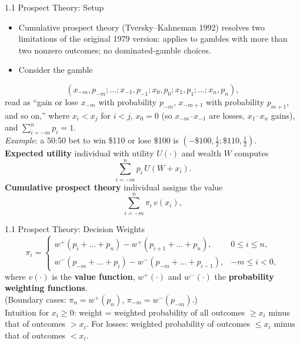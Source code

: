\documentclass[aspectratio=169, 11pt]{beamer}
\begin{document}
\begin{frame}[shrink=8]{1.1 Prospect Theory: Setup}
\begin{itemize}
  \item Cumulative prospect theory (Tversky--Kahneman 1992) resolves two limitations of the original 1979 version: applies to gambles with more than two nonzero outcomes; no dominated-gamble choices.
  \item Consider the gamble
\end{itemize}
\begin{equation}
(x_{-m},p_{-m};\ldots;x_{-1},p_{-1};x_{0},p_{0};x_{1},p_{1};\ldots;x_{n},p_{n}),
\tag{1}
\end{equation}
read as ``gain or lose $x_{-m}$ with probability $p_{-m}$, $x_{-m+1}$ with probability $p_{m+1}$, and so on,'' where $x_i<x_j$ for $i<j$, $x_0=0$ (so $x_{-m}$--$x_{-1}$ are losses, $x_1$--$x_n$ gains), and $\sum_{i=-m}^{n}p_i=1$.\\[0.5em]
\emph{Example}: a 50:50 bet to win \$110 or lose \$100 is $(-\$100,\tfrac12;\$110,\tfrac12)$.\\[0.7em]
\textbf{Expected utility} individual with utility $U(\cdot)$ and wealth $W$ computes
\begin{equation}
\sum_{i=-m}^{n} p_i\, U(W+x_i).
\tag{2}
\end{equation}
\textbf{Cumulative prospect theory} individual assigns the value
\begin{equation}
\sum_{i=-m}^{n} \pi_i\, v(x_i),
\tag{3}
\end{equation}
\end{frame}

\begin{frame}{1.1 Prospect Theory: Decision Weights}
\begin{equation}
\pi_i=
\begin{cases}
w^{+}\!\left(p_i+\ldots+p_n\right)-w^{+}\!\left(p_{i+1}+\ldots+p_n\right), & 0\le i\le n,\\[1em]
w^{-}\!\left(p_{-m}+\ldots+p_i\right)-w^{-}\!\left(p_{-m}+\ldots+p_{i-1}\right), & -m\le i<0,
\end{cases}
\tag{4}
\end{equation}
where $v(\cdot)$ is the \textbf{value function}, $w^{+}(\cdot)$ and $w^{-}(\cdot)$ the \textbf{probability weighting functions}.\\[0.3em]
\footnotesize (Boundary cases: $\pi_n=w^{+}(p_n)$, $\pi_{-m}=w^{-}(p_{-m})$.)\\[0.8em]
\alert{Intuition for $x_i\ge 0$:} weight = weighted probability of all outcomes $\ge x_i$ minus that of outcomes $> x_i$. For losses: weighted probability of outcomes $\le x_i$ minus that of outcomes $< x_i$.
\end{frame}
\end{document}
